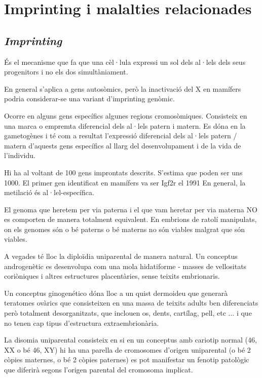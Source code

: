 \section{Imprinting i malalties relacionades}
\label{sec:impr-i-malalt}

\subsection{\textit{Imprinting}}
\label{sec:imprinting}

És el mecanisme que fa que una cèl·lula expressi un sol dels al·lels dels seus progenitors i no els dos simultàniament.

En general s'aplica a gens autosòmics, però la inactivació del X en mamífers podria considerar-se una variant d'imprinting genòmic.

Ocorre en alguns gens específics algunes regions cromosòmiques. Consisteix en una marca o empremta diferencial dels al·lels patern i matern. Es dóna en la gametogènes i té com a resultat l'expressió diferencial dels al·lels patern / matern d'aquests gens específics al llarg del desenvolupament i de la vida de l'individu.

Hi ha al voltant de 100 gens improntats descrits. S'estima que poden ser uns 1000. El primer gen identificat en mamífers va ser Igf2r el 1991 En general, la metilació és al·lel-específica.

El genoma que heretem per via paterna i el que vam heretar per via materna NO es comporten de manera totalment equivalent. En embrions de ratolí manipulats, on els genomes són o bé paterns o bé materns no són viables malgrat que són viables.

A vegades té lloc la diploïdia uniparental de manera natural. Un conceptus androgenètic es desenvolupa com una mola hidatiforme - masses de vellositats coriòniques i altres estructures placentàries, sense teixits embrionaris.

Un conceptus ginogenético dóna lloc a un quist dermoideu que generarà teratomes ovàrics que consisteixen en una massa de teixits adults ben diferenciats però totalment desorganitzats, que inclouen os, dents, cartílag, pell, etc ... i que no tenen cap tipus d'estructura extraembrionària.

La disomia uniparental consisteix en si en un conceptus amb cariotip normal (46, XX o bé 46, XY) hi ha una parella de cromosomes d'origen uniparental (o bé 2 còpies maternes, o bé 2 còpies paternes) es pot manifestar un fenotip patològic que diferirà segons l'origen parental del cromosoma implicat.


